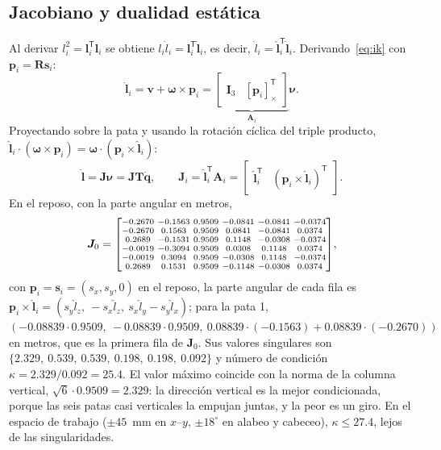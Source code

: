 \documentclass[conference]{IEEEtran}
\newcommand{\vect}[1]{\bm{#1}}
\newcommand{\T}{^{\mathsf{T}}}
\newcommand{\sk}[1]{[#1]_{\times}}
\begin{document}
\subsection{Jacobiano y dualidad estática}

Al derivar $l_i^2 = \vect l_i\T\vect l_i$ se obtiene $l_i\dot l_i = \vect l_i\T\dot{\vect l}_i$, es decir, $\dot l_i = \hat{\vect l}_i\T\dot{\vect l}_i$. Derivando~\eqref{eq:ik} con $\vect p_i = \vect R\vect s_i$:
\begin{equation}
\dot{\vect l}_i = \vect v + \vect\omega\times\vect p_i = \underbrace{\begin{bmatrix}\vect I_3 & \sk{\vect p_i}\T\end{bmatrix}}_{\vect A_i}\vect\nu .
\label{eq:Ai}
\end{equation}
Proyectando sobre la pata y usando la rotación cíclica del triple producto, $\hat{\vect l}_i\cdot(\vect\omega\times\vect p_i) = \vect\omega\cdot(\vect p_i\times\hat{\vect l}_i)$:
\begin{equation}
\dot{\vect l} = \vect J\vect\nu = \vect J\vect T\dot{\vect q},\qquad \vect J_i = \hat{\vect l}_i\T\vect A_i = \begin{bmatrix}\hat{\vect l}_i\T & (\vect p_i\times\hat{\vect l}_i)\T\end{bmatrix}.
\label{eq:jac}
\end{equation}
En el reposo, con la parte angular en metros,
\begin{equation}
{\setlength{\arraycolsep}{1.6pt}\scriptsize
\vect J_0 = \begin{bmatrix}
-0.2670 & -0.1563 & 0.9509 & -0.0841 & -0.0841 & -0.0374\\
-0.2670 & 0.1563 & 0.9509 & 0.0841 & -0.0841 & 0.0374\\
0.2689 & -0.1531 & 0.9509 & 0.1148 & -0.0308 & -0.0374\\
-0.0019 & -0.3094 & 0.9509 & 0.0308 & 0.1148 & 0.0374\\
-0.0019 & 0.3094 & 0.9509 & -0.0308 & 0.1148 & -0.0374\\
0.2689 & 0.1531 & 0.9509 & -0.1148 & -0.0308 & 0.0374
\end{bmatrix}},
\end{equation}
con $\vect p_i = \vect s_i = (s_x, s_y, 0)$ en el reposo, la parte angular de cada fila es $\vect p_i\times\hat{\vect l}_i = (s_y\hat l_z,\ -s_x\hat l_z,\ s_x\hat l_y - s_y\hat l_x)$; para la pata 1, $(-0.08839\cdot0.9509,\ -0.08839\cdot0.9509,\ 0.08839\cdot(-0.1563) + 0.08839\cdot(-0.2670))$ en metros, que es la primera fila de $\vect J_0$. Sus valores singulares son $\{2.329,\allowbreak\ 0.539,\allowbreak\ 0.539,\allowbreak\ 0.198,\allowbreak\ 0.198,\allowbreak\ 0.092\}$ y número de condición $\kappa = 2.329/0.092 = 25.4$. El valor máximo coincide con la norma de la columna vertical, $\sqrt{6}\cdot0.9509 = 2.329$: la dirección vertical es la mejor condicionada, porque las seis patas casi verticales la empujan juntas, y la peor es un giro. En el espacio de trabajo ($\pm45$~mm en $x$--$y$, $\pm18^\circ$ en alabeo y cabeceo), $\kappa \le 27.4$, lejos de las singularidades.
\end{document}
